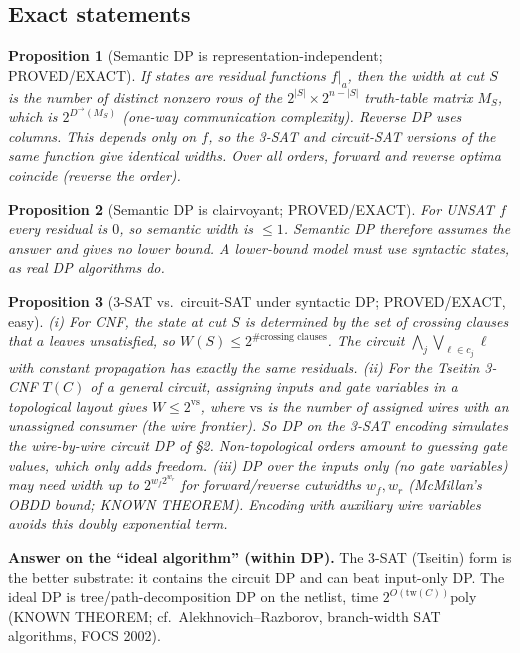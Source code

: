 \documentclass[11pt]{article}
\newtheorem{prop}{Proposition}
\begin{document}
\subsection{Exact statements}
\begin{prop}[Semantic DP is representation-independent; PROVED/EXACT]
If states are residual \emph{functions} $f|_a$, then the width at cut $S$ is the number of
distinct nonzero rows of the $2^{|S|}\times2^{n-|S|}$ truth-table matrix $M_S$, which is
$2^{D^{\to}(M_S)}$ (one-way communication complexity). Reverse DP uses columns. This depends
only on $f$, so the 3-SAT and circuit-SAT versions of the same function give identical widths.
Over all orders, forward and reverse optima coincide (reverse the order).
\end{prop}
\begin{prop}[Semantic DP is clairvoyant; PROVED/EXACT] For UNSAT $f$ every residual is
$0$, so semantic width is $\le1$. Semantic DP therefore assumes the answer and gives no lower
bound. A lower-bound model must use \emph{syntactic} states, as real DP algorithms do.
\end{prop}
\begin{prop}[3-SAT vs.\ circuit-SAT under syntactic DP; PROVED/EXACT, easy]
\leavevmode
(i) For CNF, the state at cut $S$ is determined by the set of crossing clauses that $a$
leaves unsatisfied, so $W(S)\le 2^{\#\text{crossing clauses}}$. The circuit
$\bigwedge_j\bigvee_{\ell\in c_j}\ell$ with constant propagation has exactly the same
residuals.
(ii) For the Tseitin 3-CNF $T(C)$ of a general circuit, assigning inputs and gate variables in a
topological layout gives $W\le 2^{\mathrm{vs}}$, where $\mathrm{vs}$ is the number of
assigned wires with an unassigned consumer (the wire frontier). So DP on the 3-SAT
encoding \emph{simulates} the wire-by-wire circuit DP of \S2. Non-topological orders amount
to guessing gate values, which only adds freedom.
(iii) DP over the \emph{inputs only} (no gate variables) may need width up to
$2^{w_f2^{w_r}}$ for forward/reverse cutwidths $w_f,w_r$ (McMillan's OBDD bound; KNOWN THEOREM).
Encoding with auxiliary wire variables avoids this doubly exponential term.
\end{prop}
\textbf{Answer on the ``ideal algorithm'' (within DP).} The 3-SAT (Tseitin) form is the better
substrate: it contains the circuit DP and can beat input-only DP. The ideal DP is
tree/path-decomposition DP on the netlist, time $2^{O(\mathrm{tw}(C))}\mathrm{poly}$
(KNOWN THEOREM; cf.\ Alekhnovich--Razborov, branch-width SAT algorithms, FOCS 2002).
\end{document}

